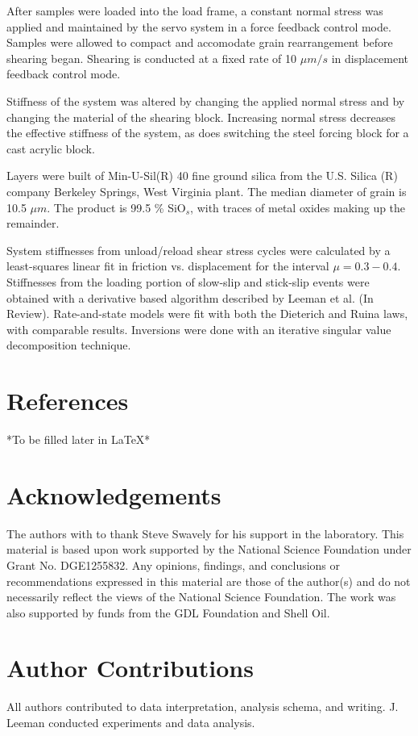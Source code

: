\documentclass[11pt]{article}
\begin{document}
After samples were loaded into the load frame, a constant normal stress was
applied and maintained by the servo system in a force feedback control mode.
Samples were allowed to compact and accomodate grain rearrangement before
shearing began. Shearing is conducted at a fixed rate of 10 $\mu m/s$ in
displacement feedback control mode.

Stiffness of the system was altered by changing the applied normal stress and by
changing the material of the shearing block. Increasing normal stress decreases
the effective stiffness of the system, as does switching the steel forcing block
for a cast acrylic block.

Layers were built of Min-U-Sil(R) 40 fine ground silica from the U.S. Silica (R)
company Berkeley Springs, West Virginia plant. The median diameter of grain is
10.5 $\mu m$. The product is 99.5 \% SiO$_s$, with traces of metal oxides making
up the remainder.

System stiffnesses from unload/reload shear stress cycles were calculated by a
least-squares linear fit in friction vs. displacement for the interval $\mu =
0.3-0.4$. Stiffnesses from the loading portion of slow-slip and stick-slip
events were obtained with a derivative based algorithm described by Leeman et
al. (In Review). Rate-and-state models were fit with both the Dieterich and
Ruina laws, with comparable results. Inversions were done with an iterative
singular value decomposition technique.  

\section{References}
*To be filled later in LaTeX*

\section{Acknowledgements}
The authors with to thank Steve Swavely for his support in the laboratory. This
material is based upon work supported by the National Science Foundation under
Grant No. DGE1255832.  Any opinions, findings, and conclusions or
recommendations expressed in this material are those of the author(s) and do not
necessarily reflect the views of the National Science Foundation. The work was
also supported by funds from the GDL Foundation and Shell Oil.

\section{Author Contributions}
All authors contributed to data interpretation, analysis schema, and writing.
J. Leeman conducted experiments and data analysis.
\end{document}
